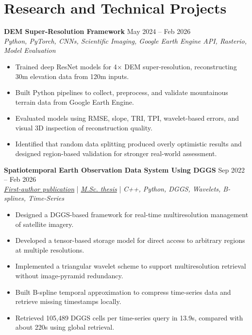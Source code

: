 \documentclass[a4paper,10pt]{article}
\begin{document}

\section*{Research and Technical Projects}

\noindent
\textbf{DEM Super-Resolution Framework} \hfill May 2024 -- Feb 2026 \\
\textit{Python, PyTorch, CNNs, Scientific Imaging, Google Earth Engine API, Rasterio, Model Evaluation}
\begin{itemize}[leftmargin=0.25in]
    \item Trained deep ResNet models for 4$\times$ DEM super-resolution, reconstructing 30m elevation data from 120m inputs.
    \item Built Python pipelines to collect, preprocess, and validate mountainous terrain data from Google Earth Engine.
    \item Evaluated models using RMSE, slope, TRI, TPI, wavelet-based errors, and visual 3D inspection of reconstruction quality.
    \item Identified that random data splitting produced overly optimistic results and designed region-based validation for stronger real-world assessment.
\end{itemize}

\noindent
\textbf{Spatiotemporal Earth Observation Data System Using DGGS} \hfill Sep 2022 -- Feb 2026 \\
\textit{\href{https://doi.org/10.3390/rs17040570}{First-author publication}} | \textit{\href{https://ucalgary.scholaris.ca/items/114b394b-e516-4732-bd3a-45dd6160d480}{M.Sc. thesis}} | \textit{C++, Python, DGGS, Wavelets, B-splines, Time-Series}
\begin{itemize}[leftmargin=0.25in]
    \item Designed a DGGS-based framework for real-time multiresolution management of satellite imagery.
    \item Developed a tensor-based storage model for direct access to arbitrary regions at multiple resolutions.
    \item Implemented a triangular wavelet scheme to support multiresolution retrieval without image-pyramid redundancy.
    \item Built B-spline temporal approximation to compress time-series data and retrieve missing timestamps locally.
    \item Retrieved 105,489 DGGS cells per time-series query in 13.9s, compared with about 220s using global retrieval.
\end{itemize}
\end{document}

